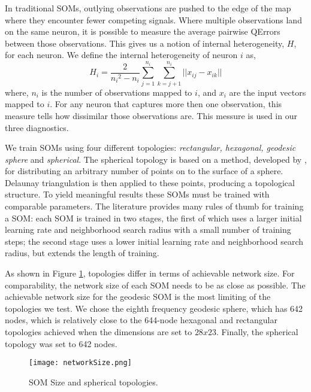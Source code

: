 In traditional SOMs, outlying observations are pushed to the edge of the map
where they encounter fewer competing signals.
Where multiple observations land on the same neuron, it is possible to measure
the average pairwise QErrors between those observations.  This gives us a
notion of internal heterogeneity, \(H\), for each neuron.  We define the
internal heterogeneity of neuron \(i\) as,
 \begin{equation}
   {H_i} = \frac{2}{{n_i}^2-{n_i}}\sum_{j=1}^{n_i}\sum_{k=j+1}^{n_i} ||{x_{ij}}-{x_{ik}}||
 \label{eqno1}
 \end{equation}
where, \(n_i\) is the number of observations mapped to \(i\), and \(x_i\) are
the input vectors mapped to \(i\).  For any neuron that captures more then one
observation, this measure tells how dissimilar those observations are.  This
messure is used in our three diagnostics.

We train SOMs using four different topologies:
\emph{rectangular, hexagonal, geodesic sphere} and \emph{spherical}.  The spherical
topology is based on a method, developed by \cite{Rakhmanov94}, for
distributing an arbitrary number of points on to the surface of a sphere.
Delaunay triangulation is then applied to these points, producing a
topological structure.  To yield meaningful results these SOMs must be trained
with comparable parameters.  The literature provides many rules of thumb for
training a SOM: each SOM is trained in two stages, the first of which uses a larger
initial learning rate and neighborhood search radius with a small number of
training steps; the second stage uses a lower initial learning rate and
neighborhood search radius, but extends the length of training.

As shown in Figure \ref{fig:nSize}, topologies differ in terms of achievable
network size.  For comparability, the network size of each SOM needs to be as
close as possible.  The achievable network size for the geodesic SOM is the
most limiting of the topologies we test. We chose the eighth frequency
geodesic sphere, which has 642 nodes, which is relatively close to the
644-node hexagonal and rectangular topologies achieved when the dimensions are
set to \(28x23\). Finally, the spherical topology was set to 642 nodes.

\begin{figure}[htb]
  \begin{center}
\caption{SOM Size and spherical topologies.}
\label{fig:nSize}
\texttt{[image: networkSize.png]}
\end{center}
\end{figure}




